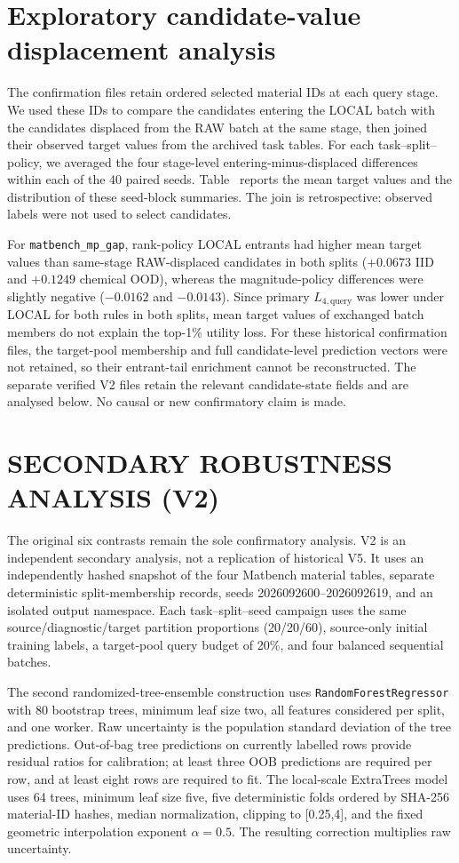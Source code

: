\documentclass[11pt]{article}
\newcommand{\Lfourq}{\ensuremath{L_{4,\mathrm{query}}}\xspace}
\begin{document}
\clearpage
\section{Exploratory candidate-value displacement analysis}
The confirmation files retain ordered selected material IDs at each query stage. We used these IDs to compare the candidates entering the LOCAL batch with the candidates displaced from the RAW batch at the same stage, then joined their observed target values from the archived task tables. For each task--split--policy, we averaged the four stage-level entering-minus-displaced differences within each of the 40 paired seeds. Table~ reports the mean target values and the distribution of these seed-block summaries. The join is retrospective: observed labels were not used to select candidates.

For \texttt{matbench\_mp\_gap}, rank-policy LOCAL entrants had higher mean target values than same-stage RAW-displaced candidates in both splits ($+0.0673$ IID and $+0.1249$ chemical OOD), whereas the magnitude-policy differences were slightly negative ($-0.0162$ and $-0.0143$). Since primary $\Lfourq$ was lower under LOCAL for both rules in both splits, mean target values of exchanged batch members do not explain the top-1\% utility loss. For these historical confirmation files, the target-pool membership and full candidate-level prediction vectors were not retained, so their entrant-tail enrichment cannot be reconstructed. The separate verified V2 files retain the relevant candidate-state fields and are analysed below. No causal or new confirmatory claim is made.


\section{SECONDARY ROBUSTNESS ANALYSIS (V2)}
The original six contrasts remain the sole confirmatory analysis. V2 is an independent secondary analysis, not a replication of historical V5. It uses an independently hashed snapshot of the four Matbench material tables, separate deterministic split-membership records, seeds 2026092600--2026092619, and an isolated output namespace. Each task--split--seed campaign uses the same source/diagnostic/target partition proportions (20/20/60), source-only initial training labels, a target-pool query budget of 20\%, and four balanced sequential batches.

The second randomized-tree-ensemble construction uses \texttt{RandomForestRegressor} \citep{breiman2001random} with 80 bootstrap trees, minimum leaf size two, all features considered per split, and one worker. Raw uncertainty is the population standard deviation of the tree predictions. Out-of-bag tree predictions on currently labelled rows provide residual ratios for calibration; at least three OOB predictions are required per row, and at least eight rows are required to fit. The local-scale ExtraTrees model uses 64 trees, minimum leaf size five, five deterministic folds ordered by SHA-256 material-ID hashes, median normalization, clipping to [0.25,4], and the fixed geometric interpolation exponent \(\alpha=0.5\). The resulting correction multiplies raw uncertainty.
\end{document}

